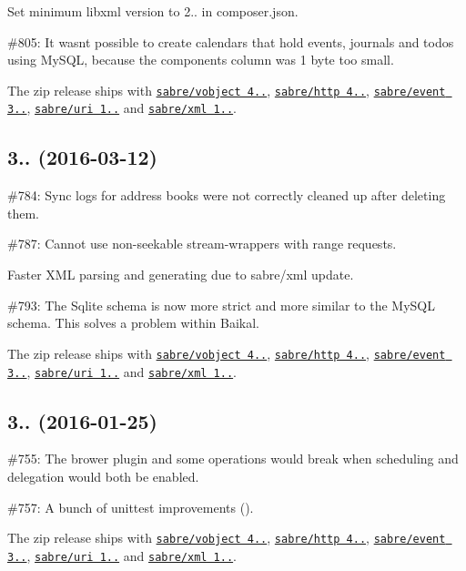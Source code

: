 \begin{DoxyItemize}
\item Set minimum libxml version to 2.. in {\ttfamily composer.\+json}.
\item \#805\+: It wasn\textquotesingle{}t possible to create calendars that hold events, journals and todos using My\+S\+QL, because the {\ttfamily components} column was 1 byte too small.
\item The zip release ships with \href{http://sabre.io/vobject/}{\tt sabre/vobject 4..}, \href{http://sabre.io/http/}{\tt sabre/http 4..}, \href{http://sabre.io/event/}{\tt sabre/event 3..}, \href{http://sabre.io/uri/}{\tt sabre/uri 1..} and \href{http://sabre.io/xml/}{\tt sabre/xml 1..}.
\end{DoxyItemize}

\subsection*{3.. (2016-\/03-\/12) }


\begin{DoxyItemize}
\item \#784\+: Sync logs for address books were not correctly cleaned up after deleting them.
\item \#787\+: Cannot use non-\/seekable stream-\/wrappers with range requests.
\item Faster X\+ML parsing and generating due to sabre/xml update.
\item \#793\+: The Sqlite schema is now more strict and more similar to the My\+S\+QL schema. This solves a problem within Baikal.
\item The zip release ships with \href{http://sabre.io/vobject/}{\tt sabre/vobject 4..}, \href{http://sabre.io/http/}{\tt sabre/http 4..}, \href{http://sabre.io/event/}{\tt sabre/event 3..}, \href{http://sabre.io/uri/}{\tt sabre/uri 1..} and \href{http://sabre.io/xml/}{\tt sabre/xml 1..}.
\end{DoxyItemize}

\subsection*{3.. (2016-\/01-\/25) }


\begin{DoxyItemize}
\item \#755\+: The brower plugin and some operations would break when scheduling and delegation would both be enabled.
\item \#757\+: A bunch of unittest improvements ().
\item The zip release ships with \href{http://sabre.io/vobject/}{\tt sabre/vobject 4..}, \href{http://sabre.io/http/}{\tt sabre/http 4..}, \href{http://sabre.io/event/}{\tt sabre/event 3..}, \href{http://sabre.io/uri/}{\tt sabre/uri 1..} and \href{http://sabre.io/xml/}{\tt sabre/xml 1..}.
\end{DoxyItemize}

